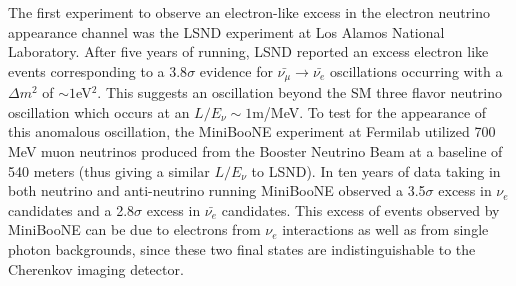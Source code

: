 The first experiment to observe an electron-like excess in the electron neutrino appearance channel was the LSND experiment \cite{No16} at Los Alamos National Laboratory. After five years of running, LSND reported an excess electron like events corresponding to a 3.8$\sigma$ evidence for $\bar{\nu_{\mu}} \rightarrow \bar{\nu_{e}}$ oscillations occurring with a $\Delta m^{2}$ of $\sim 1$eV$^{2}$. This suggests an oscillation beyond the SM three flavor neutrino oscillation which occurs at an $L/E_{\nu} \sim 1$m/MeV. To test for the appearance of this anomalous oscillation, the MiniBooNE experiment \cite{No17} at Fermilab utilized 700 MeV muon neutrinos produced from the Booster Neutrino Beam at a baseline of 540 meters (thus giving a similar $L/E_{\nu}$ to LSND). In ten years of data taking in both neutrino and anti-neutrino running MiniBooNE observed a 3.5$\sigma$ excess in $\nu_{e}$ candidates and a 2.8$\sigma$ excess in $\bar{\nu_{e}}$ candidates. This excess of events observed by MiniBooNE can be due to electrons from $\nu_{e}$ interactions as well as from single photon backgrounds, since these two final states are indistinguishable to the Cherenkov imaging detector.



